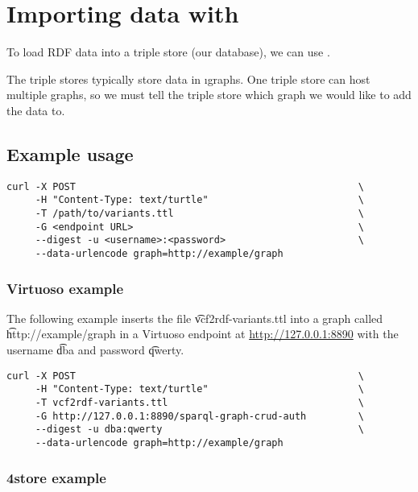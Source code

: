 \section{Importing data with }
\label{sec:curl}

  To load RDF data into a triple store (our database), we can use .

  The triple stores typically store data in \i{graphs}.  One triple store
  can host multiple graphs, so we must tell the triple store which graph we
  would like to add the data to.

\subsection{Example usage}


\begin{lstlisting}
curl -X POST                                                 \
     -H "Content-Type: text/turtle"                          \
     -T /path/to/variants.ttl                                \
     -G <endpoint URL>                                       \
     --digest -u <username>:<password>                       \
     --data-urlencode graph=http://example/graph
\end{lstlisting}

\subsubsection{Virtuoso example}

\begin{sloppypar}
The following example inserts the file \t{vcf2rdf-variants.ttl} into
a graph called \t{http://example/graph} in a Virtuoso endpoint at
\url{http://127.0.0.1:8890} with the username \t{dba} and
password \t{qwerty}.
\end{sloppypar}

\begin{lstlisting}
curl -X POST                                                 \
     -H "Content-Type: text/turtle"                          \
     -T vcf2rdf-variants.ttl                                 \
     -G http://127.0.0.1:8890/sparql-graph-crud-auth         \
     --digest -u dba:qwerty                                  \
     --data-urlencode graph=http://example/graph
\end{lstlisting}

\subsubsection{4store example}


